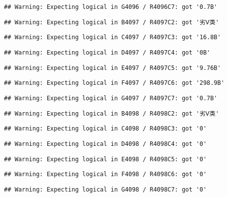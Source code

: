 \documentclass[
]{article}
\begin{document}
\begin{verbatim}
## Warning: Expecting logical in G4096 / R4096C7: got '0.7B'
\end{verbatim}

\begin{verbatim}
## Warning: Expecting logical in B4097 / R4097C2: got '劣Ⅴ类'
\end{verbatim}

\begin{verbatim}
## Warning: Expecting logical in C4097 / R4097C3: got '16.8B'
\end{verbatim}

\begin{verbatim}
## Warning: Expecting logical in D4097 / R4097C4: got '0B'
\end{verbatim}

\begin{verbatim}
## Warning: Expecting logical in E4097 / R4097C5: got '9.76B'
\end{verbatim}

\begin{verbatim}
## Warning: Expecting logical in F4097 / R4097C6: got '298.9B'
\end{verbatim}

\begin{verbatim}
## Warning: Expecting logical in G4097 / R4097C7: got '0.7B'
\end{verbatim}

\begin{verbatim}
## Warning: Expecting logical in B4098 / R4098C2: got '劣Ⅴ类'
\end{verbatim}

\begin{verbatim}
## Warning: Expecting logical in C4098 / R4098C3: got '0'
\end{verbatim}

\begin{verbatim}
## Warning: Expecting logical in D4098 / R4098C4: got '0'
\end{verbatim}

\begin{verbatim}
## Warning: Expecting logical in E4098 / R4098C5: got '0'
\end{verbatim}

\begin{verbatim}
## Warning: Expecting logical in F4098 / R4098C6: got '0'
\end{verbatim}

\begin{verbatim}
## Warning: Expecting logical in G4098 / R4098C7: got '0'
\end{verbatim}
\end{document}
